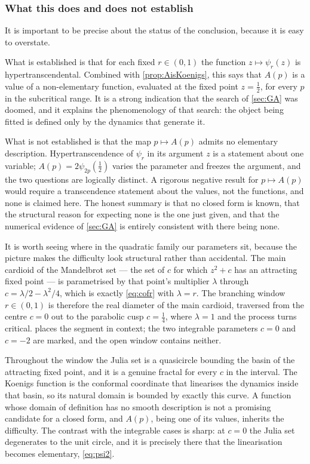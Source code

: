 \subsubsection*{What this does and does not establish}

It is important to be precise about the status of the conclusion, because it is easy to
overstate.

What is established is that for each fixed $r\in(0,1)$ the function $z\mapsto\psi_r(z)$
is hypertranscendental. Combined with \cref{prop:AisKoenigs}, this says that $A(p)$ is a
value of a non-elementary function, evaluated at the fixed point $z=\tfrac12$, for every
$p$ in the subcritical range. It is a strong indication that the search of \cref{sec:GA}
was doomed, and it explains the phenomenology of that search: the object being fitted is
defined only by the dynamics that generate it.

What is not established is that the map $p\mapsto A(p)$ admits no elementary description.
Hypertranscendence of $\psi_r$ in its argument $z$ is a statement about one variable;
$A(p) = 2\psi_{2p}(\tfrac12)$ varies the parameter and freezes the argument, and the two
questions are logically distinct. A rigorous negative result for $p\mapsto A(p)$ would
require a transcendence statement about the values, not the functions, and none is
claimed here. The honest summary is that no closed form is known, that the structural
reason for expecting none is the one just given, and that the numerical evidence of
\cref{sec:GA} is entirely consistent with there being none.

It is worth seeing where in the quadratic family our parameters sit, because the picture
makes the difficulty look structural rather than accidental. The main cardioid of the
Mandelbrot set --- the set of $c$ for which $z^2+c$ has an attracting fixed point --- is
parametrised by that point's multiplier $\lambda$ through $c = \lambda/2 - \lambda^2/4$,
which is exactly \cref{eq:cofr} with $\lambda = r$. The branching window $r\in(0,1)$ is
therefore the real diameter of the main cardioid, traversed from the centre $c=0$ out to
the parabolic cusp $c=\tfrac14$, where $\lambda=1$ and the process turns critical.
 places the segment in context; the two integrable parameters $c=0$
and $c=-2$ are marked, and the open window contains neither.

Throughout the window the Julia set is a quasicircle bounding the basin of the
attracting fixed point, and it is a genuine fractal for every $c$ in the interval. The
Koenigs function is the conformal coordinate that linearises the dynamics inside that
basin, so its natural domain is bounded by exactly this curve. A function whose domain
of definition has no smooth description is not a promising candidate for a closed form,
and $A(p)$, being one of its values, inherits the difficulty. The contrast with the
integrable cases is sharp: at $c=0$ the Julia set degenerates to the unit circle, and it
is precisely there that the linearisation becomes elementary, \cref{eq:psi2}.


